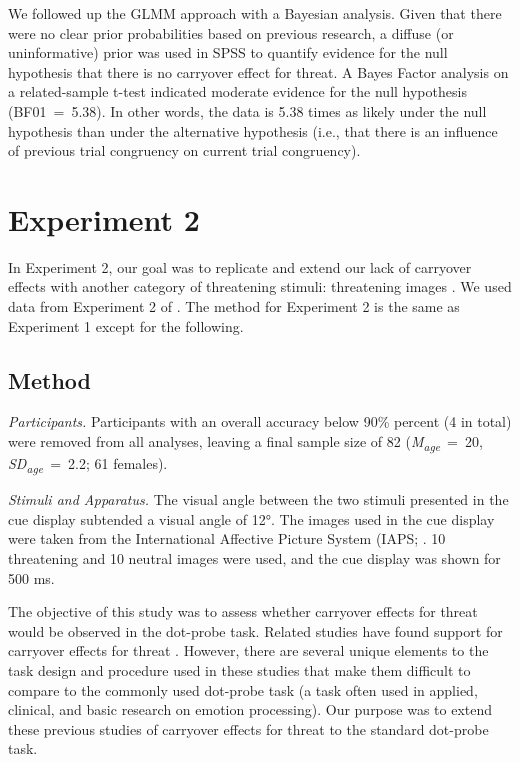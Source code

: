 \documentclass[issue,twocolumn,empirical, authordate,10pt]{jote-new-article}
\begin{document}
We followed up the GLMM approach with a Bayesian analysis. Given that there were no clear prior probabilities based on previous research, a diffuse (or uninformative) prior was used in SPSS to quantify evidence for the null hypothesis that there is no carryover effect for threat. A Bayes Factor analysis on a related-sample t-test indicated moderate evidence for the null hypothesis (BF01~=~5.38). In other words, the data is 5.38 times as likely under the null hypothesis than under the alternative hypothesis (i.e., that there is an influence of previous trial congruency on current trial congruency).

\section{Experiment 2}

In Experiment 2, our goal was to replicate and extend our lack of carryover effects with another category of threatening stimuli: threatening images \parencite{Lang2008}. We used data from Experiment 2 of \parencite{Carlson2020}. The method for Experiment 2 is the same as Experiment 1 except for the following.


\subsection{Method}

\emph{Participants. }Participants with an overall accuracy below 90\% percent (4 in total) were removed from all analyses, leaving a final sample size of 82 (\emph{M}\textsubscript{\emph{age}}~=~20, \emph{SD}\textsubscript{\emph{age}}~=~2.2; 61 females).

\emph{Stimuli and Apparatus. }The visual angle between the two stimuli presented in the cue display subtended a visual angle of 12°. The images used in the cue display were taken from the International Affective Picture System (IAPS; \parencite[200][]{Lang2008}. 10 threatening and 10 neutral images were used, and the cue display was shown for 500 ms.


\begin{originalPurpose}
The objective of this study was to assess whether carryover effects for threat would be observed in the dot-probe task. Related studies have found support for carryover effects for threat \parencite{Gladwin2017, Gladwin2019, Gladwin2020, Gladwin2019a}. However, there are several unique elements to the task design and procedure used in these studies that make them difficult to compare to the commonly used dot-probe task (a task often used in applied, clinical, and basic research on emotion processing). Our purpose was to extend these previous studies of carryover effects for threat to the standard dot-probe task.
\end{originalPurpose}
\end{document}
